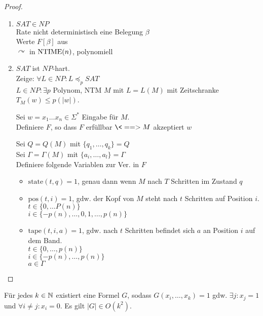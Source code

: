 \begin{proof}\
	\begin{enumerate}
	\item $SAT\in NP$\\
		Rate nicht deterministisch eine Belegung $\beta$\\
		Werte $F[\beta]$ aus\\
		$\curvearrowright$ in $\operatorname{NTIME}(n)$, polynomiell
	\item $SAT$ ist $NP$-hart.\\
		Zeige: $\forall L\in NP : L \preceq_p SAT$\\
		$L\in NP : \exists p$ Polynom, \ac{NTM} $M$ mit $L=L(M)$ mit Zeitschranke $T_M(w)\leq p(|w|)$.
		
		Sei $w = x_1\dots x_n\in\Sigma^*$ Eingabe für $M$.\\
		Definiere $F$, so dass $F$ erfüllbar $\<==> M$ akzeptiert $w$
		
		Sei $Q=Q(M)$ mit $\{q_1,\dots,q_k\}=Q$\\
		Sei $\Gamma = \Gamma(M)$ mit $\{a_i,\dots,a_l\} = \Gamma$\\
		Definiere folgende Variablen zur Ver. in $F$
		\begin{itemize}
		\item $\mathrm{state}(t,q) = 1$, genau dann wenn $M$ nach $T$ Schritten im Zustand $q$
		\item $\mathrm{pos}(t,i) = 1$, gdw. der Kopf von $M$ steht nach $t$ Schritten auf Position $i$.\\
		$t\in\{0,\dots P(n)\}$\\
		$i\in \{-p(n),\dots,0,1,\dots,p(n)\}$
		\item $\mathrm{tape}(t,i,a) = 1$, gdw. nach $t$ Schritten befindet sich $a$ an Position $i$ auf dem Band.\\
		$t\in\{0,\dots,p(n)\}$\\
		$i\in\{-p(n),\dots,p(n)\}$\\
		$a\in\Gamma$ \qedhere
		\end{itemize}
	\end{enumerate}
\end{proof}
\begin{lemma}
	Für jedes $k\in\mathbb{N}$ existiert eine Formel $G$, sodass $G(x_i,\dots,x_k)=1$ gdw. $\exists j: x_j = 1$ und $\forall i \neq j: x_i = 0$. Es gilt $|G| \in O(k^2)$.
\end{lemma}
